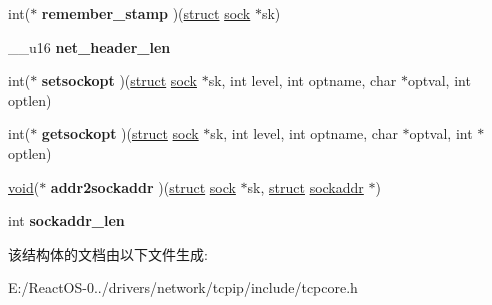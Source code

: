 \begin{DoxyCompactItemize}
\item 
\mbox{\label{structtcp__func_aa67430d504545a695d279f87915a42b3}} 
int($\ast$ {\bfseries remember\+\_\+stamp} )(\hyperlink{interfacestruct}{struct} \hyperlink{structsock}{sock} $\ast$sk)
\item 
\mbox{\label{structtcp__func_a5d44250096e3edb30f1f067336f59f0e}} 
\+\_\+\+\_\+u16 {\bfseries net\+\_\+header\+\_\+len}
\item 
\mbox{\label{structtcp__func_a4a7f964d71901009b18c1b56dd3a9757}} 
int($\ast$ {\bfseries setsockopt} )(\hyperlink{interfacestruct}{struct} \hyperlink{structsock}{sock} $\ast$sk, int level, int optname, char $\ast$optval, int optlen)
\item 
\mbox{\label{structtcp__func_a78caebcaa5265e06c4b229ff3a21f9a2}} 
int($\ast$ {\bfseries getsockopt} )(\hyperlink{interfacestruct}{struct} \hyperlink{structsock}{sock} $\ast$sk, int level, int optname, char $\ast$optval, int $\ast$optlen)
\item 
\mbox{\label{structtcp__func_aaae984075ae6f922073fe717712adeaa}} 
\hyperlink{interfacevoid}{void}($\ast$ {\bfseries addr2sockaddr} )(\hyperlink{interfacestruct}{struct} \hyperlink{structsock}{sock} $\ast$sk, \hyperlink{interfacestruct}{struct} \hyperlink{structsockaddr}{sockaddr} $\ast$)
\item 
\mbox{\label{structtcp__func_ada90babd9ead667ec9689ff4ba8abd87}} 
int {\bfseries sockaddr\+\_\+len}
\end{DoxyCompactItemize}


该结构体的文档由以下文件生成\+:\begin{DoxyCompactItemize}
\item 
E\+:/\+React\+O\+S-\/0../drivers/network/tcpip/include/tcpcore.\+h\end{DoxyCompactItemize}
